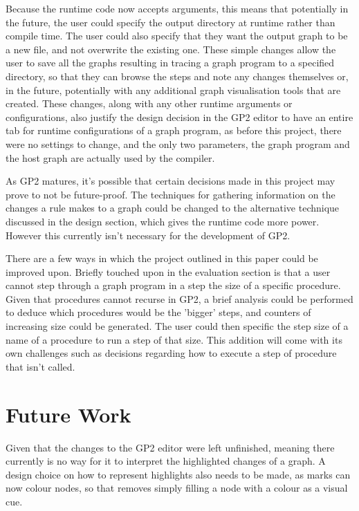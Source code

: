 \documentclass{UoYCSproject}
\begin{document}
Because the runtime code now accepts arguments, this means that potentially in the future, the user could specify the output directory at runtime rather than compile time. The user could also specify that they want the output graph to be a new file, and not overwrite the existing one. These simple changes allow the user to save all the graphs resulting in tracing a graph program to a specified directory, so that they can browse the steps and note any changes themselves or, in the future, potentially with any additional graph visualisation tools that are created. These changes, along with any other runtime arguments or configurations, also justify the design decision in the GP2 editor to have an entire tab for runtime configurations of a graph program, as before this project, there were no settings to change, and the only two parameters, the graph program and the host graph are actually used by the compiler.

As GP2 matures, it's possible that certain decisions made in this project may prove to not be future-proof.	The techniques for gathering information on the changes a rule makes to a graph could be changed to the alternative technique discussed in the design section, which gives the runtime code more power. However this currently isn't necessary for the development of GP2.

There are a few ways in which the project outlined in this paper could be improved upon. Briefly touched upon in the evaluation section is that a user cannot step through a graph program in a step the size of a specific procedure. Given that procedures cannot recurse in GP2, a brief analysis could be performed to deduce which procedures would be the 'bigger' steps, and counters of increasing size could be generated. The user could then specific the step size of a name of a procedure to run a step of that size. This addition will come with its own challenges such as decisions regarding how to execute a step of procedure that isn't called.

\section{Future Work}

Given that the changes to the GP2 editor were left unfinished, meaning there currently is no way for it to interpret the highlighted changes of a graph. A design choice on how to represent highlights also needs to be made, as marks can now colour nodes, so that removes simply filling a node with a colour as a visual cue.
\end{document}
